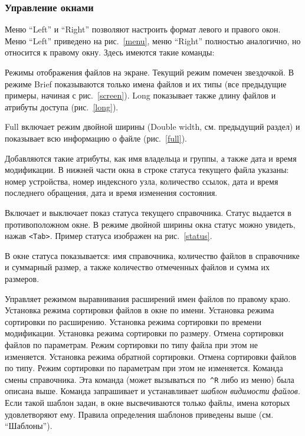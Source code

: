 \subsubsection{Управление окнами}

Меню ``Left'' и ``Right'' позволяют настроить формат
левого и правого окон. Меню ``Left'' приведено на рис.~\ref{menu},
меню ``Right'' полностью аналогично, но относится к
правому окну. Здесь имеются такие команды:
\begin{example}
Режимы отображения файлов на экране. Текущий режим
помечен звездочкой. В режиме Brief показываются
только имена файлов и их типы (все предыдущие примеры,
начиная с рис.~\ref{screen}). Long показывает также
длину файлов и атрибуты доступа (рис.~\ref{long}).
\end{example}


Full включает режим двойной ширины (Double width, см. предыдущий раздел)
и показывает всю информацию о файле (рис.~\ref{full}).


Добавляются такие атрибуты, как имя владельца и группы,
а также дата и время модификации. В нижней части окна в строке статуса
текущего файла указаны: номер устройства, номер индексного узла,
количество ссылок, дата и время последнего обращения, дата и время
изменения состояния.

\begin{example}
Включает и выключает показ статуса текущего справочника. Статус
выдается в противоположном окне. В режиме двойной ширины
окна статус можно увидеть, нажав {\tt <Tab>}. Пример статуса
изображен на рис.~\ref{status}.
\end{example}


В окне статуса показывается: имя справочника, количество файлов в
справочнике и суммарный размер, а также количество отмеченных файлов и
сумма их размеров.

\begin{example}
Управляет режимом выравнивания расширений имен файлов по правому краю.
Установка режима сортировки файлов в окне по имени.
Установка режима сортировки по расширению.
Установка режима сортировки по времени модификации.
Установка режима сортировки по размеру.
Отмена сортировки файлов по параметрам. Режим сортировки по типу
файла при этом не изменяется.
Установка режима обратной сортировки.
Отмена сортировки файлов по типу. Режим сортировки по параметрам
при этом не изменяется.
Команда смены справочника. Эта команда (может вызываться по~{\tt \^{}R} либо
из меню) была описана выше.
Команда запрашивает и устанавливает {\em шаблон видимости файлов}.
Если такой шаблон задан, в окне высвечиваются только файлы,
имена которых удовлетворяют ему. Правила определения шаблонов
приведены выше (см. ``Шаблоны'').
\end{example}

